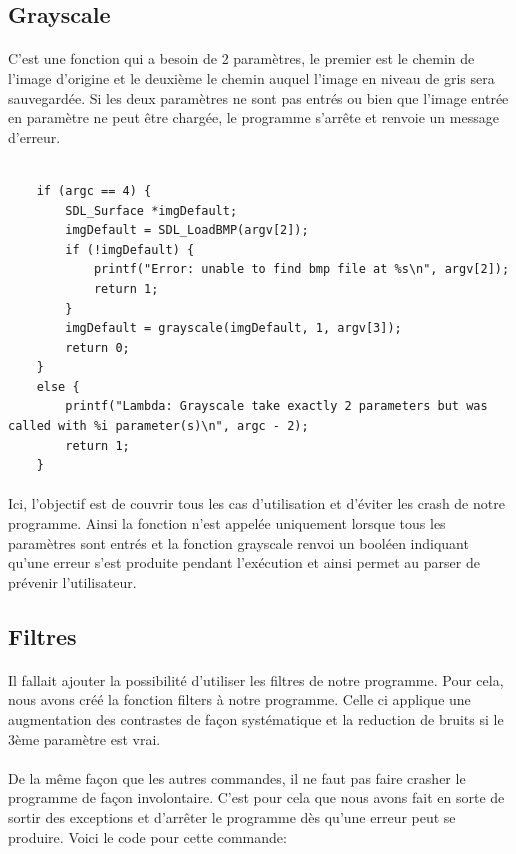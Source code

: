\documentclass{article}
\begin{document}
\subsection{Grayscale}

\paragraph{}C'est une fonction qui a besoin de 2 paramètres, le premier est le chemin de l'image d'origine et le deuxième le chemin auquel l'image en niveau de gris sera sauvegardée. Si les deux paramètres ne sont pas entrés ou bien que l'image entrée en paramètre ne peut être chargée, le programme s'arrête et renvoie un message d'erreur.

\begin{lstlisting}

	if (argc == 4) {
		SDL_Surface *imgDefault;
		imgDefault = SDL_LoadBMP(argv[2]);
		if (!imgDefault) {
			printf("Error: unable to find bmp file at %s\n", argv[2]);
			return 1;
		}
		imgDefault = grayscale(imgDefault, 1, argv[3]);
		return 0;
	}
	else {
		printf("Lambda: Grayscale take exactly 2 parameters but was called with %i parameter(s)\n", argc - 2);
		return 1;
	}
\end{lstlisting}

\paragraph{}Ici, l'objectif est de couvrir tous les cas d'utilisation et d'éviter les crash de notre programme. Ainsi la fonction n'est appelée uniquement lorsque tous les paramètres sont entrés et la fonction grayscale renvoi un booléen indiquant qu'une erreur s'est produite pendant l'exécution et ainsi permet au parser de prévenir l'utilisateur.

\subsection{Filtres}

\paragraph{}Il fallait ajouter la possibilité d'utiliser les filtres de notre programme. Pour cela, nous avons créé la fonction filters à notre programme. Celle ci applique une augmentation des contrastes de façon systématique et la reduction de bruits si le 3ème paramètre est vrai.

\paragraph{}De la même façon que les autres commandes, il ne faut pas faire crasher le programme de façon involontaire. C'est pour cela que nous avons fait en sorte de sortir des exceptions et d'arrêter le programme dès qu'une erreur peut se produire. Voici le code pour cette commande:
\end{document}

